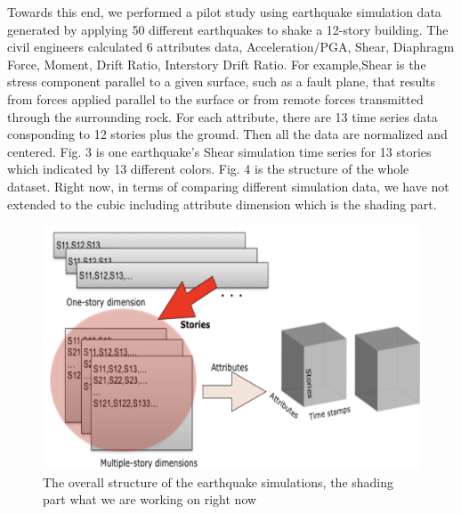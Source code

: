 Towards this end, we performed a pilot study using  earthquake simulation data generated by applying 50 different earthquakes to shake a 12-story building. The civil engineers calculated 6 attributes data, Acceleration/PGA, Shear, Diaphragm Force, Moment, Drift Ratio, Interstory Drift Ratio. For example,Shear is the stress component parallel to a given surface, such as a fault plane, that results from forces applied parallel to the surface or from remote forces transmitted through the surrounding rock. For each attribute, there are 13 time series data consponding to 12 stories plus the ground. Then all the data are  normalized and centered. Fig. 3 is one earthquake's Shear simulation time series for 13 stories which indicated by 13 different colors. Fig. 4 is the structure of the whole dataset. Right now, in terms of comparing different simulation data, we have not extended to the cubic including attribute dimension which is the shading part.
\begin{figure}[h]
	\centering %
	\includegraphics[width=\columnwidth]{figs/structure} 
	\caption{The overall structure of the earthquake simulations, the shading part what we are working on right now}
	\label{fig:data}
\end{figure}


